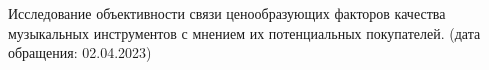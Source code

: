 \begin{thebibliography}{9}
	
	 Исследование объективности связи ценообразующих факторов качества музыкальных инструментов с мнением их потенциальных покупателей. (дата обращения: 02.04.2023)
	
\end{thebibliography}

